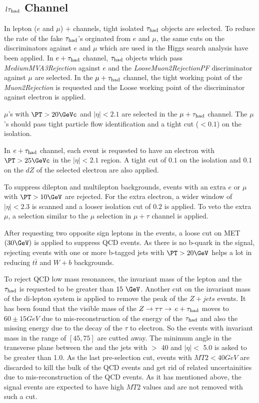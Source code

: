 \subsection{\texorpdfstring{$\,l\tau_{\rm had}$ Channel}{lepton-tau Channel}}
\label{sect:leptonTauCuts}
In lepton ($e$ and $\mu$) $+$ \Tau channels, tight isolated $\tau_{\rm had}$ objects are selected. To reduce the rate of the fake $\tau_{\rm had}$'s orginated from $e$ and $\mu$, the same cuts on the discriminators against $e$ and $\mu$ which are used in the Higgs search analysis \cite{CMS_AN_2013-188} have been applied. In $e + \tau_{\rm had}$ channel, $\tau_{\rm had}$ objects which pass \emph{MediumMVA3Rejection} against $e$ and the \emph{LooseMuon2RejectionPF} discriminator against $\mu$ are selected. In the $\mu + \tau_{\rm had}$ channel, the tight working point of the \emph{Muon2Rejection} is requested and the Loose working point of the discriminator against electron is applied.

$\mu$'s with $\PT > 20 \GeVc$ and $|\eta|<2.1$ are selected in the $\mu + \tau_{\rm had}$ channel. The $\mu$'s should pass tight particle flow identification and a tight cut ($<0.1$) on the isolation.
 
In $e + \tau_{\rm had}$ channel, each event is requested to have an electron with $\PT >25 \GeVc$ in the $|\eta| < 2.1 $ region. A tight cut of $0.1$ on the isolation and $0.1$ on the $dZ$ of the selected electron are also applied.

To suppress dilepton and multilepton backgrounds, events with an extra $e$ or $\mu$ with $\PT >10 \GeV$ are rejected. For the extra electron, a wider window of $|\eta|<2.3$ is scanned and a looser isolation cut of $0.2$ is applied. To veto the extra $\mu$, a selection similar to the $\mu$ selection in $\mu+\tau$ channel is applied.

After requesting two opposite sign leptons in the events, a loose cut on MET $(30 \GeV)$ is applied to suppress QCD events. As there is no b-quark in the signal, rejecting events with one or more b-tagged jets with $\PT > 20 \GeV$ helps a lot in reducing $t\bar{t}$ and $W+b$ backgrounds.

To reject QCD low mass resonances, the invariant mass of the lepton and the $\tau_{\rm had}$ is requested to be greater than $15\ \GeV$. Another cut on the invariant mass of the di-lepton system is applied to remove the peak of the $Z+jets$ events. It has been found that the visible mass of the $Z\to\tau\tau\to\,e +\tau_{\rm had}$ moves to $60 \pm 15 GeV$ due to mis-reconstruction of the energy of the $\tau_{\rm had}$ and also the missing energy due to the decay of the $\tau$ to electron. So the events with invariant mass in the range of $[45,75]$ are cutted away. The minimum angle in the transverse plane between the \MET and the jets with \PT $>$ 40 \GeVc and $|\eta| <$ 5.0 is asked to be greater than 1.0. As the last pre-selection cut, events with $MT2<40 GeV$ are discarded to kill the bulk of the QCD events and get rid of related uncertainities due to mis-reconstruction of the QCD events. As it has mentioned above, the signal events are expected to have high $MT2$ values and are not removed with such a cut.

